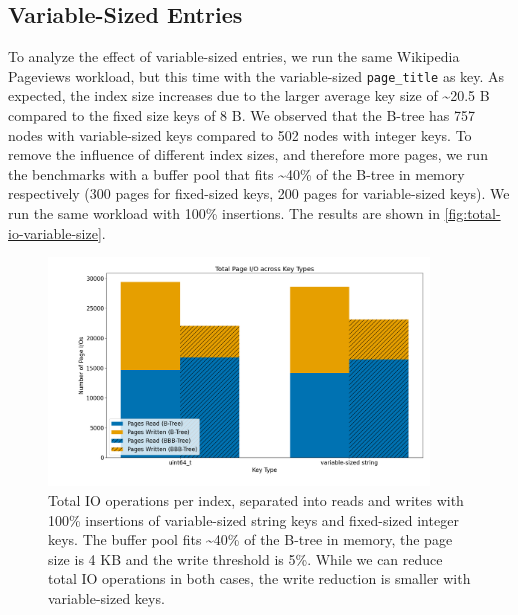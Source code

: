 

\subsection*{Variable-Sized Entries}
To analyze the effect of variable-sized entries, we run the same Wikipedia Pageviews workload, but this time with the variable-sized \texttt{page\_title} as key.
As expected, the index size increases due to the larger average key size of \textasciitilde 20.5 B compared to the fixed size keys of 8 B.
We observed that the B-tree has 757 nodes with variable-sized keys compared to 502 nodes with integer keys.
To remove the influence of different index sizes, and therefore more pages, we run the benchmarks with a buffer pool that fits \textasciitilde40\% of the B-tree in memory respectively (300 pages for fixed-sized keys, 200 pages for variable-sized keys).
We run the same workload with 100\% insertions.
The results are shown in \autoref{fig:total-io-variable-size}.

\begin{figure}[htbp]
  \centering
  \includegraphics[width=0.9\textwidth]{figures/evaluation/pageviews_total_io_variable_size.png}
  \caption{Total \ac{IO} operations per index, separated into reads and writes with 100\% insertions of variable-sized string keys and fixed-sized integer keys. The buffer pool fits \textasciitilde40\% of the B-tree in memory, the page size is 4 KB and the write threshold is 5\%. While we can reduce total \ac{IO} operations in both cases, the write reduction is smaller with variable-sized keys.}
  \label{fig:total-io-variable-size}
\end{figure}

